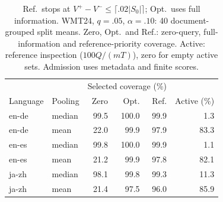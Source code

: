 \begin{table}[t]
\centering\small
\begin{tabular}{llrrrr}
\toprule
 &  & \multicolumn{3}{c}{Selected coverage (\%)} & \\
Language & Pooling & Zero & Opt. & Ref. & Active (\%) \\
\midrule
en-de & median & 99.5 & 100.0 & 99.9 & 1.3 \\
en-de & mean & 22.0 & 99.9 & 97.9 & 83.3 \\
en-es & median & 99.8 & 100.0 & 99.9 & 1.1 \\
en-es & mean & 21.2 & 99.9 & 97.8 & 82.1 \\
ja-zh & median & 98.1 & 99.8 & 99.3 & 11.3 \\
ja-zh & mean & 21.4 & 97.5 & 96.0 & 85.9 \\
\bottomrule
\end{tabular}
\caption{Ref.\ stops at $V^+-V^-\le\lceil .02|S_0|\rceil$; Opt.\ uses full information. WMT24, $q=.05$, $\alpha=.10$: 40 document-grouped split means. Zero, Opt.\ and Ref.: zero-query, full-information and reference-priority coverage. Active: reference inspection ($100Q/(mT)$), zero for empty active sets. Admission uses metadata and finite scores.}
\label{tab:review-external}
\end{table}
